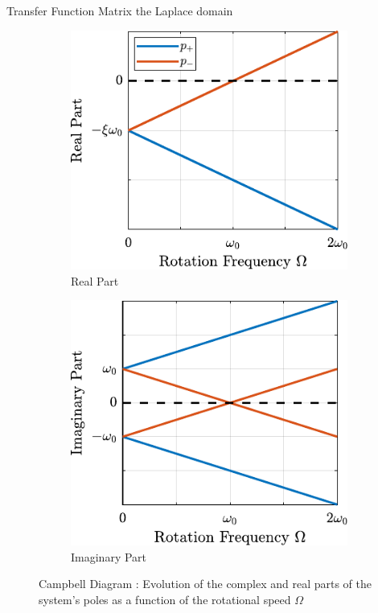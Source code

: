 \documentclass[t, minted]{clean-beamer}
\begin{document}
\begin{frame}[label={sec:org9fc6840}]{Transfer Function Matrix the Laplace domain}
\begin{figure}[htbp]
\begin{subfigure}[c]{0.4\linewidth}
\includegraphics[width=\linewidth]{figs/campbell_diagram_real.pdf}
\caption{\label{fig:campbell_diagram_real} Real Part}
\end{subfigure}
\hfill
\begin{subfigure}[c]{0.4\linewidth}
\includegraphics[width=\linewidth]{figs/campbell_diagram_imag.pdf}
\caption{\label{fig:campbell_diagram_imag} Imaginary Part}
\end{subfigure}
\hfill
\caption{Campbell Diagram : Evolution of the complex and real parts of the system's poles as a function of the rotational speed \(\Omega\)}
\centering
\end{figure}
\end{frame}
\end{document}
